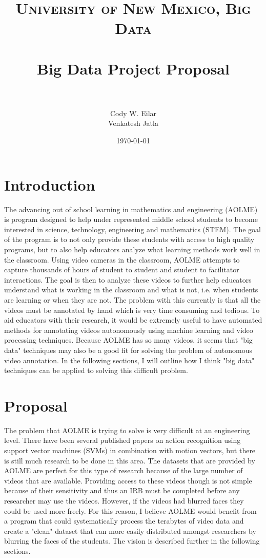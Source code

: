 \documentclass[paper=a4, fontsize=11pt]{scrartcl} %
\title{	
\normalfont \normalsize 
\textsc{University of New Mexico, Big Data} \\ [25pt] %
\horrule{0.5pt} \\[0.4cm] %
\huge Big Data Project Proposal \\ %
\horrule{2pt} \\[0.5cm] %
}
\author{Cody W. Eilar\\ 
Venkatesh Jatla }
\date{\normalsize\today}
\numberwithin{equation}{section} %
\numberwithin{figure}{section} %
\numberwithin{table}{section} %
\begin{document}
\maketitle
\thispagestyle{empty}
\section{Introduction}
The advancing out of school learning in mathematics and engineering (AOLME) is program designed to help under 
represented middle school students to become interested in science, technology, engineering and mathematics (STEM). The goal of
the program is to not only provide these students with access to high quality programs, but to also help educators analyze
what learning methods work well in the classroom. Using video cameras in the classroom, AOLME attempts to capture 
thousands of hours of student to student and student to facilitator interactions. The goal is then to analyze these videos
to further help educators understand what is working in the classroom and what is not, i.e. when students are learning or when they are not. The problem with this currently is that
all the videos must be annotated by hand which is very time consuming and tedious. To aid educators with their research, 
it would be extremely useful to have automated methods for annotating videos autonomously using machine learning and 
video processing techniques. Because AOLME has so many videos, it seems that "big data" techniques may also be a
good fit for solving the problem of autonomous video annotation. In the following sections, I will outline how I think
"big data" techniques can be applied to solving this difficult problem. 

\section{Proposal}
The problem that AOLME is trying to solve is very difficult at an engineering level. There have been several published
papers on action recognition using support vector machines (SVMs) in combination with motion vectors, but there is still
much research to be done in this area. The datasets that are provided by AOLME are perfect for this type of research because
of the large number of videos that are available. Providing access to these videos though is not simple because of their 
sensitivity and thus an IRB must be completed before any researcher may use the videos. However, if the videos had blurred 
faces they could be used more freely. For this reason, I believe AOLME would benefit from a program that could systematically 
process the terabytes of video data and create a "clean" dataset that can more easily distributed amongst researchers by 
blurring the faces of the students. The vision is described further in the following sections. 
\end{document}
